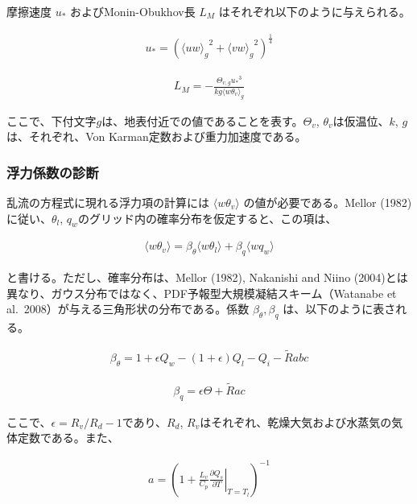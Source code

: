 摩擦速度 \(u_*\) およびMonin-Obukhov長 \(L_M\)
はそれぞれ以下のように与えられる。

\begin{eqnarray}u_*=\left({\langle uw \rangle_g}^2+{\langle vw \rangle_g}^2 \right)^\frac{1}{4}\end{eqnarray}

\begin{eqnarray}L_M=-\frac{\Theta_{v,g} {u_*}^3}{kg \langle w\theta_v \rangle_g}\end{eqnarray}

ここで、下付文字\(g\)は、地表付近での値であることを表す。\(\Theta_v\),
\(\theta_v\)は仮温位、\(k\), \(g\)は、それぞれ、Von
Karman定数および重力加速度である。

\hypertarget{ux6d6eux529bux4fc2ux6570ux306eux8a3aux65ad}{%
\subsubsection{浮力係数の診断}\label{ux6d6eux529bux4fc2ux6570ux306eux8a3aux65ad}}

乱流の方程式に現れる浮力項の計算には \(\langle w\theta_v \rangle\)
の値が必要である。Mellor (1982)に従い、\(\theta_l\),
\(q_w\)のグリッド内の確率分布を仮定すると、この項は、

\begin{eqnarray}\langle w\theta_v \rangle=\beta_\theta \langle w\theta_l \rangle + \beta_q \langle wq_w \rangle\end{eqnarray}

と書ける。ただし、確率分布は、Mellor (1982), Nakanishi and Niino
(2004)とは異なり、ガウス分布ではなく、PDF予報型大規模凝結スキーム（Watanabe
et al.~2008）が与える三角形状の分布である。係数
\(\beta_\theta , \beta_q\) は、以下のように表される。

\begin{eqnarray}\beta_\theta=1+\epsilon Q_w-(1+\epsilon)Q_l-Q_i-\tilde{R}abc\end{eqnarray}

\begin{eqnarray}\beta_q=\epsilon \Theta +\tilde{R}ac\end{eqnarray}

ここで、\(\epsilon=R_v/R_d-1\)であり、\(R_d\),
\(R_v\)はそれぞれ、乾燥大気および水蒸気の気体定数である。また、

\begin{eqnarray}a=\left(1+\frac{L_v}{C_p}\left.\frac{\partial Q_s}{\partial T}\right|_{T=T_l}\right)^{-1}\end{eqnarray}

